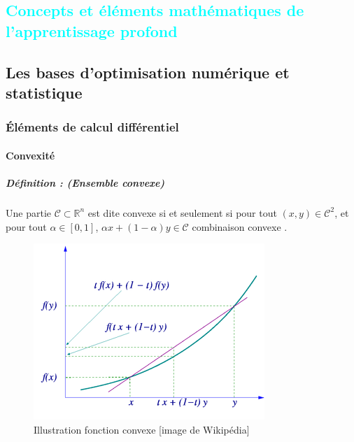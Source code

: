 
%
%

\textcolor{cyan}{\chapter{Concepts et éléments mathématiques de l'apprentissage profond}}
\section{Les bases d'optimisation numérique et statistique}
	\subsection{Éléments de calcul différentiel}
	\subsubsection{\textbf{Convexité}}
		\paragraph*{Définition : (Ensemble convexe)} 
		Une partie $\mathcal{C} \subset \mathbb{R}^n $ est dite convexe si et seulement si pour tout $(x,y) \in \mathcal{C}^2$, 
		et pour tout $ \alpha \in [0, 1]$,
		$ \alpha x + (1 - \alpha)y \in \mathcal{C}$ combinaison convexe \cite{jtshiman:2021}.
		
		\begin{figure}[bth]
			\centering
			\includegraphics{images/convex_function_graph.png}
			\caption{Illustration fonction convexe [image de Wikipédia]}
			\label{fig:convexe_graph}
		\end{figure}	
		
